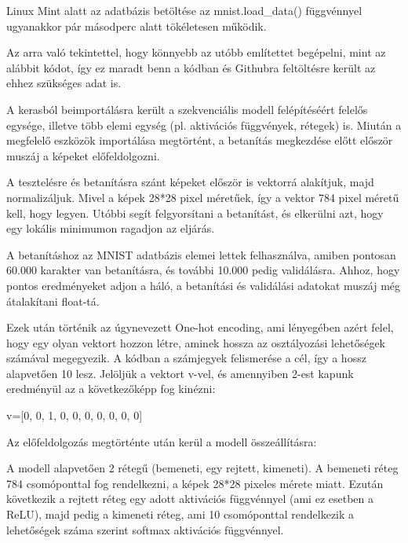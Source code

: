 \documentclass[hidelinks,12pt,a4paper]{report}
\begin{document}
Linux Mint alatt az adatbázis betöltése az mnist.load\_data() függvénnyel ugyanakkor pár másodperc alatt tökéletesen működik.

Az arra való tekintettel, hogy könnyebb az utóbb említettet begépelni, mint az alábbit kódot, így ez maradt benn a kódban és Githubra feltöltésre került az ehhez szükséges adat is.




A kerasból beimportálásra került a szekvenciális modell felépítéséért felelős egysége, illetve több elemi egység (pl. aktivációs függvények, rétegek) is.
Miután a megfelelő eszközök importálása megtörtént, a betanítás megkezdése előtt először muszáj a képeket előfeldolgozni.

A tesztelésre és betanításra szánt képeket először is vektorrá alakítjuk, majd normalizáljuk.
Mivel a képek 28*28 pixel méretűek, így a vektor 784 pixel méretű kell, hogy legyen.
Utóbbi segít felgyorsítani a betanítást, és elkerülni azt, hogy egy lokális minimumon ragadjon az eljárás.

A betanításhoz az MNIST adatbázis elemei lettek felhasználva, amiben pontosan 60.000 karakter van betanításra, és további 10.000 pedig validálásra.
Ahhoz, hogy pontos eredményeket adjon a háló, a betanítási és validálási adatokat muszáj még átalakítani float-tá.


Ezek után történik az úgynevezett One-hot encoding, ami lényegében azért felel, hogy egy olyan vektort hozzon létre, aminek hossza az osztályozási lehetőségek számával megegyezik.
A kódban a számjegyek felismerése a cél, így a hossz alapvetően 10 lesz.
Jelöljük a vektort v-vel, és amennyiben 2-est kapunk eredményül az a következőképp fog kinézni:

v=[0, 0, 1, 0, 0, 0, 0, 0, 0, 0]


Az előfeldolgozás megtörténte után kerül a modell összeállításra:


A modell alapvetően 2 rétegű (bemeneti, egy rejtett, kimeneti). A bemeneti réteg 784 csomóponttal fog rendelkezni, a képek 28*28 pixeles mérete miatt. Ezután következik a rejtett réteg egy adott aktivációs függvénnyel (ami ez esetben a ReLU), majd pedig a kimeneti réteg, ami 10 csomóponttal rendelkezik a lehetőségek száma szerint softmax aktivációs függvénnyel.
\end{document}
